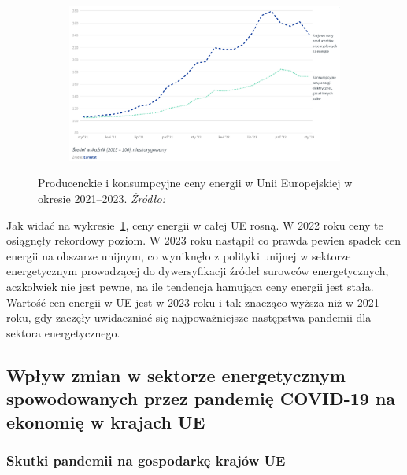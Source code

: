 \documentclass[polish, twoside, 12pt, a4paper]{article}
\theoremstyle{definition}
\theoremstyle{plain}
\theoremstyle{remark}
\begin{document}
\begin{figure}[hbt]
  \centering

  \begin{subfigure}[t]{0.45\textwidth}
    \hspace{-1.5cm}
    \includegraphics[width=1.4\textwidth]{./out_figures/figure_9}
  \end{subfigure}

  \captionsetup{margin=10pt,font=small,labelfont=bf,width=.8\textwidth}

  \caption[Producenckie i konsumpcyjne ceny energii w Unii Europejskiej w okresie 2021--2023]{Producenckie i konsumpcyjne ceny energii w Unii Europejskiej w okresie 2021--2023. \textit{Źródło:} \cite{council2023}}\label{fig:x9}
\end{figure}

Jak widać na wykresie~\ref{fig:x9}, ceny energii w całej UE rosną. W 2022 roku ceny te osiągnęły rekordowy poziom. W 2023 roku nastąpił co prawda pewien spadek cen energii na obszarze unijnym, co wyniknęło z polityki unijnej w sektorze energetycznym prowadzącej do dywersyfikacji źródeł surowców energetycznych, aczkolwiek nie jest pewne, na ile tendencja hamująca ceny energii jest stała. Wartość cen energii w UE jest w 2023 roku i tak znacząco wyższa niż w 2021 roku, gdy zaczęły uwidaczniać się najpoważniejsze następstwa pandemii dla sektora energetycznego. 
\subsection{Wpływ zmian w sektorze energetycznym spowodowanych przez pandemię COVID-19 na ekonomię w krajach UE}

\subsubsection{Skutki pandemii na gospodarkę krajów UE}
\end{document}
